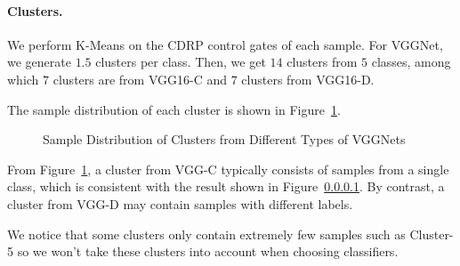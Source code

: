 \documentclass[sigplan,10pt,review]{acmart}\settopmatter{printfolios=true,printccs=false,printacmref=false}
\begin{document}
\paragraph{Clusters.} We perform K-Means on the CDRP control gates of each sample. 
For VGGNet, we generate $1.5$ clusters per class.
Then, we get $14$ clusters from $5$ classes, among which $7$ clusters are from VGG16-C and $7$ clusters from VGG16-D. 

The sample distribution of each cluster is shown in Figure~\ref{fig:vgg-cluster}.

\begin{figure}[!htp]
    \centering
{}

{}
    \caption{Sample Distribution of Clusters from Different Types of VGGNets}
    \label{fig:vgg-cluster}

\end{figure}

From Figure~\ref{fig:vgg-cluster}, a cluster from VGG-C typically consists of samples from a single class, which is consistent with the result shown in Figure~\ref{}. 
By contrast, a cluster from VGG-D may contain samples with different labels.

We notice that some clusters only contain extremely few samples such as Cluster-5 so we won't take these clusters into account when choosing classifiers.
\end{document}
